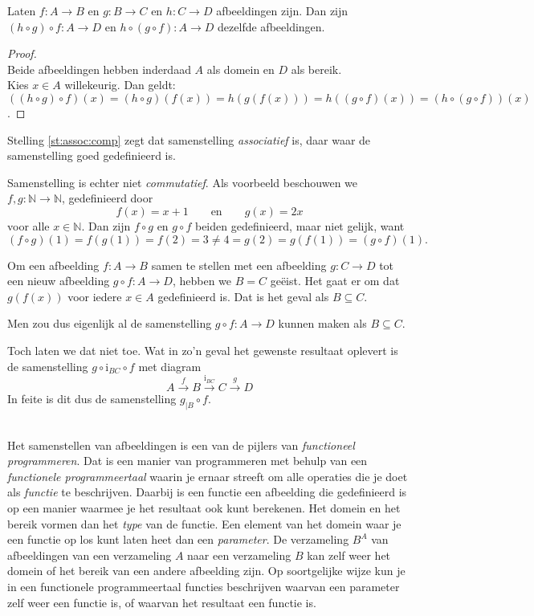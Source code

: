 \begin{theorem}\label{st:assoc:comp}
Laten $f:A\rightarrow B$ en $g:B\rightarrow C$ en $h:C\rightarrow D$ afbeeldingen zijn. Dan zijn $(h\circ g)\circ f: A\rightarrow D$ en $h\circ(g\circ f):A\rightarrow D$ dezelfde afbeeldingen.
\end{theorem}
\begin{proof}\mbox{}\\
Beide afbeeldingen hebben inderdaad $A$ als domein en $D$ als bereik.\\[1.5pt]
Kies $x\in A$ willekeurig. Dan geldt:\\[1.5pt]
$((h\circ g)\circ f)(x)=(h\circ g)(f(x))=h(g(f(x)))=h((g\circ f)(x))=(h\circ(g\circ f))(x)$.
\end{proof}

Stelling \ref{st:assoc:comp} zegt dat samenstelling \textit{associatief} is, daar waar de samenstelling goed gedefinieerd is.

Samenstelling is echter niet \textit{commutatief}. Als voorbeeld beschouwen we $f, g:\mathbb{N}\rightarrow\mathbb{N}$, gedefinieerd door
    $$f(x)=x+1\qquad\text{en}\qquad g(x)=2x$$
voor alle $x\in\mathbb{N}$. Dan zijn $f\circ g$ en $g\circ f$ beiden gedefinieerd, maar niet gelijk, want
$$(f\circ g)(1)=f(g(1))=f(2)=3\not=4=g(2)=g(f(1))=(g\circ f)(1).$$

Om een afbeelding $f:A\rightarrow B$ samen te stellen met een afbeelding $g:C\rightarrow D$ tot een nieuw afbeelding $g\circ f:A\rightarrow D$, hebben we $B=C$ ge\"eist. Het gaat er om dat $g(f(x))$ voor iedere $x\in A$ gedefinieerd is. Dat is het geval als $B\subseteq C$.

Men zou dus eigenlijk al de samenstelling $g\circ f: A\rightarrow D$ kunnen maken als $B\subseteq C$.

Toch laten we dat niet toe. Wat in zo'n geval het gewenste resultaat oplevert is de samenstelling $g\circ\text{i}_{BC}\circ f$ met diagram
$$A\overset{f}{\rightarrow}B\overset{\text{i}_{BC}}{\rightarrow}C\overset{g}{\rightarrow}D$$
In feite is dit dus de samenstelling $g_{|B}\circ f$.

\begin{aside}\mbox{}\\
Het samenstellen van afbeeldingen is een van de pijlers van \textit{functioneel programmeren}. Dat is een manier van programmeren met behulp van een \textit{functionele programmeertaal} waarin je ernaar streeft om alle operaties die je doet als \textit{functie} te beschrijven. Daarbij is een functie een afbeelding die gedefinieerd is op een manier waarmee je het resultaat ook kunt berekenen. Het domein en het bereik vormen dan het \textit{type} van de functie. Een element van het domein waar je een functie op los kunt laten heet dan een \textit{parameter}. De verzameling $B^A$ van afbeeldingen van een verzameling $A$ naar een verzameling $B$ kan zelf weer het domein of het bereik van een andere afbeelding zijn. Op soortgelijke wijze kun je in een functionele programmeertaal functies beschrijven waarvan een parameter zelf weer een functie is, of waarvan het resultaat een functie is.
\end{aside}


